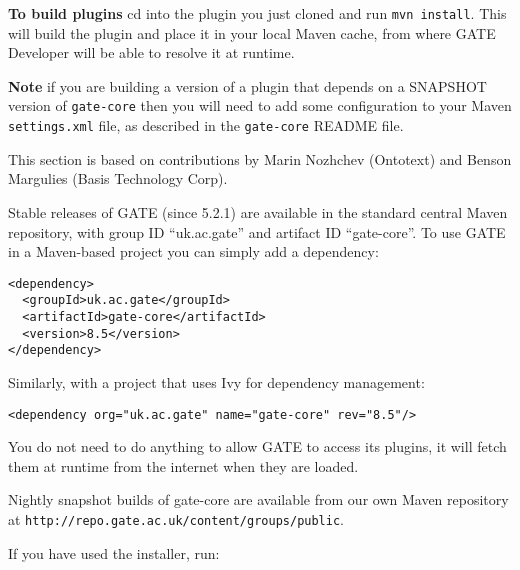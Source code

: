 {\bf To build plugins} cd into the plugin you just cloned and run
\verb!mvn install!.  This will build the plugin and place it in your local
Maven cache, from where GATE Developer will be able to resolve it at runtime.

{\bf Note} if you are building a version of a plugin that depends on a SNAPSHOT
version of \verb!gate-core! then you will need to add some configuration to
your Maven \verb!settings.xml! file, as described in the \verb!gate-core!
README file.


This section is based on contributions by Marin Nozhchev (Ontotext) and Benson
Margulies (Basis Technology Corp).

Stable releases of GATE (since 5.2.1) are available in the standard central
Maven repository, with group ID ``uk.ac.gate'' and artifact ID ``gate-core''.
To use GATE in a Maven-based project you can simply add a dependency:
\begin{small}
\begin{verbatim}
<dependency>
  <groupId>uk.ac.gate</groupId>
  <artifactId>gate-core</artifactId>
  <version>8.5</version>
</dependency>
\end{verbatim}
\end{small}

Similarly, with a project that uses Ivy for dependency management:
\begin{small}
\begin{verbatim}
<dependency org="uk.ac.gate" name="gate-core" rev="8.5"/>
\end{verbatim}
\end{small}

You do not need to do anything to allow GATE to access its plugins, it will
fetch them at runtime from the internet when they are loaded.

Nightly snapshot builds of gate-core are available from our own Maven
repository at \verb|http://repo.gate.ac.uk/content/groups/public|.


If you have used the installer, run:

